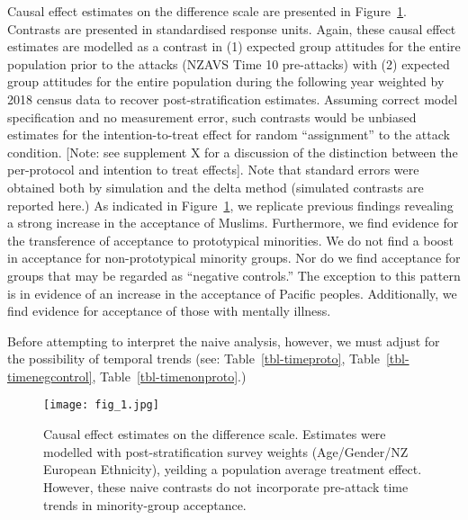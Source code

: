 \documentclass[
  singlecolumn]{report}
\begin{document}
Causal effect estimates on the difference scale are presented in
Figure~\ref{fig-results1}. Contrasts are presented in standardised
response units. Again, these causal effect estimates are modelled as a
contrast in (1) expected group attitudes for the entire population prior
to the attacks (NZAVS Time 10 pre-attacks) with (2) expected group
attitudes for the entire population during the following year weighted
by 2018 census data to recover post-stratification estimates. Assuming
correct model specification and no measurement error, such contrasts
would be unbiased estimates for the intention-to-treat effect for random
``assignment'' to the attack condition. {[}Note: see supplement X for a
discussion of the distinction between the per-protocol and intention to
treat effects{]}. Note that standard errors were obtained both by
simulation and the delta method (simulated contrasts are reported here.)
As indicated in Figure~\ref{fig-results1}, we replicate previous
findings revealing a strong increase in the acceptance of Muslims.
Furthermore, we find evidence for the transference of acceptance to
prototypical minorities. We do not find a boost in acceptance for
non-prototypical minority groups. Nor do we find acceptance for groups
that may be regarded as ``negative controls.'' The exception to this
pattern is in evidence of an increase in the acceptance of Pacific
peoples. Additionally, we find evidence for acceptance of those with
mentally illness.

Before attempting to interpret the naive analysis, however, we must
adjust for the possibility of temporal trends (see:
Table~\ref{tbl-timeproto}, Table~\ref{tbl-timenegcontrol},
Table~\ref{tbl-timenonproto}.)

\begin{figure}

{\centering \texttt{[image: fig\_1.jpg]}

}

\caption{\label{fig-results1}Causal effect estimates on the difference
scale. Estimates were modelled with post-stratification survey weights
(Age/Gender/NZ European Ethnicity), yeilding a population average
treatment effect. However, these naive contrasts do not incorporate
pre-attack time trends in minority-group acceptance.}

\end{figure}
\end{document}
